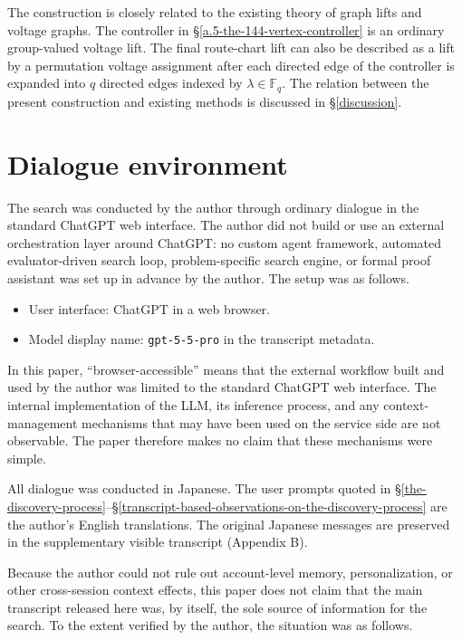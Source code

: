 \documentclass[11pt]{article}
\theoremstyle{definition}
\theoremstyle{remark}
\providecommand{\tightlist}{\setlength{\itemsep}{0pt}\setlength{\parskip}{0pt}}
\renewcommand{\_}{\textunderscore\allowbreak}
\begin{document}
The construction is closely related to the existing theory of graph
lifts and voltage graphs. The controller in \S\ref{a.5-the-144-vertex-controller} is an ordinary
group-valued voltage lift. The final route-chart lift can also be
described as a lift by a permutation voltage assignment after each
directed edge of the controller is expanded into \(q\) directed edges
indexed by \(\lambda\in\mathbb F_q\). The relation between the present
construction and existing methods is discussed in \S\ref{discussion}.


\section{Dialogue environment}\label{dialogue-environment}

The search was conducted by the author through ordinary dialogue in the
standard ChatGPT web interface. The author did not build or use an
external orchestration layer around ChatGPT: no custom agent framework,
automated evaluator-driven search loop, problem-specific search engine,
or formal proof assistant was set up in advance by the author. The setup
was as follows.

\begin{itemize}
\tightlist
\item
  User interface: ChatGPT in a web browser.
\item
  Model display name: \texttt{gpt-5-5-pro} in the transcript metadata.
\end{itemize}

In this paper, ``browser-accessible'' means that the external workflow
built and used by the author was limited to the standard ChatGPT web
interface. The internal implementation of the LLM, its inference
process, and any context-management mechanisms that may have been used
on the service side are not observable. The paper therefore makes no
claim that these mechanisms were simple.

All dialogue was conducted in Japanese. The user prompts quoted in
\S\ref{the-discovery-process}--\S\ref{transcript-based-observations-on-the-discovery-process} are the author's English translations. The original Japanese
messages are preserved in the supplementary visible transcript (Appendix
B).

Because the author could not rule out account-level memory,
personalization, or other cross-session context effects, this paper does
not claim that the main transcript released here was, by itself, the
sole source of information for the search. To the extent verified by the
author, the situation was as follows.
\end{document}
